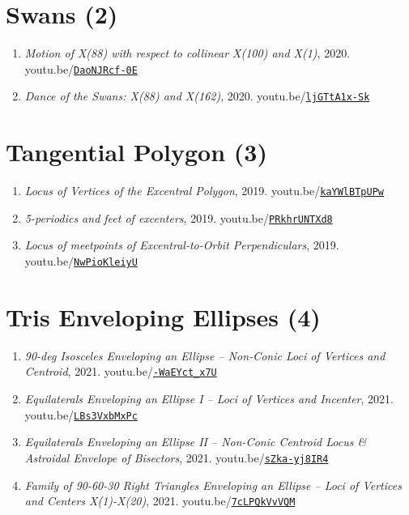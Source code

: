 \documentclass[12pt]{article}
\begin{document}
\section{Swans (2)}

\begin{enumerate}[resume]
\item \textit{Motion of X(88) with respect to collinear X(100) and X(1)}, 2020. youtu.be/\href{https://youtu.be/DaoNJRcf-0E}{\nolinkurl{DaoNJRcf-0E}}
\item \textit{Dance of the Swans: X(88) and X(162)}, 2020. youtu.be/\href{https://youtu.be/ljGTtA1x-Sk}{\nolinkurl{ljGTtA1x-Sk}}
\end{enumerate}

\section{Tangential Polygon (3)}

\begin{enumerate}[resume]
\item \textit{Locus of Vertices of the Excentral Polygon}, 2019. youtu.be/\href{https://youtu.be/kaYWlBTpUPw}{\nolinkurl{kaYWlBTpUPw}}
\item \textit{5-periodics and feet of excenters}, 2019. youtu.be/\href{https://youtu.be/PRkhrUNTXd8}{\nolinkurl{PRkhrUNTXd8}}
\item \textit{Locus of meetpoints of Excentral-to-Orbit Perpendiculars}, 2019. youtu.be/\href{https://youtu.be/NwPioKleiyU}{\nolinkurl{NwPioKleiyU}}
\end{enumerate}

\section{Tris Enveloping Ellipses (4)}

\begin{enumerate}[resume]
\item \textit{90-deg Isosceles Enveloping an Ellipse -- Non-Conic Loci of Vertices and Centroid}, 2021. youtu.be/\href{https://youtu.be/-WaEYct_x7U}{\nolinkurl{-WaEYct\_x7U}}
\item \textit{Equilaterals Enveloping an Ellipse I -- Loci of Vertices and Incenter}, 2021. youtu.be/\href{https://youtu.be/LBs3VxbMxPc}{\nolinkurl{LBs3VxbMxPc}}
\item \textit{Equilaterals Enveloping an Ellipse II -- Non-Conic Centroid Locus \& Astroidal Envelope of Bisectors}, 2021. youtu.be/\href{https://youtu.be/sZka-yj8IR4}{\nolinkurl{sZka-yj8IR4}}
\item \textit{Family of 90-60-30 Right Triangles Enveloping an Ellipse -- Loci of Vertices and Centers X(1)-X(20)}, 2021. youtu.be/\href{https://youtu.be/7cLPQkVvVQM}{\nolinkurl{7cLPQkVvVQM}}
\end{enumerate}
\end{document}
